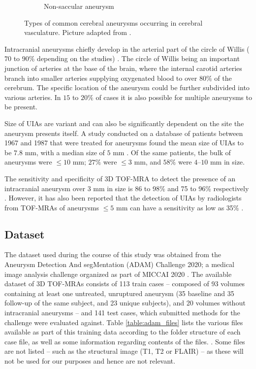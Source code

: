 \begin{figure}[h]
\begin{subfigure}{.45\linewidth}
		\caption[Non-saccular aneurysm]{Non-saccular aneurysm}
	\end{subfigure}
	\caption[Types of aneurysms.]{Types of common cerebral aneurysms occurring in cerebral vasculature. Picture adapted from \citeauthor{Withers2013}.}
	\label{fig:aneurysms.png}
\end{figure}

Intracranial aneurysms chiefly develop in the arterial part of the circle of Willis ($70$ to $90\%$ depending on the studies) \cite{Rodriguez-Regent2014}. The circle of Willis being an important junction of arteries at the base of the brain, where the internal carotid arteries branch into smaller arteries supplying oxygenated blood to over $80\%$ of the cerebrum. The specific location of the aneurysm could be further subdivided into various arteries. In $15$ to $20\%$ of cases it is also possible for multiple aneurysms to be present.

Size of UIAs are variant and can also be significantly dependent on the site the aneurysm presents itself. A study conducted on a database of patients between 1967 and 1987 that were treated for aneurysms found the mean size of UIAs to be $7.8$ mm, with a median size of $5$ mm \cite{Weir2002}. Of the same patients, the bulk of aneurysms were $\leq 10$ mm; $27\%$ were $\leq 3$ mm, and $58\%$ were $4$--$10$ mm in size.

The sensitivity and specificity of 3D TOF-MRA to detect the presence of an intracranial aneurysm over 3 mm in size is 86 to 98\% and 75 to 96\% respectively \cite{Sailer2014}. However, it has also been reported that the detection of UIAs by radiologists from TOF-MRAs of aneurysms $\leq 5$ mm can have a sensitivity as low as 35\% \cite{White2001}.

\subsection{Dataset}
The dataset used during the course of this study was obtained from the Aneurysm Detection And segMentation (ADAM) Challenge 2020; a medical image analysis challenge organized as part of MICCAI 2020 \cite{Timmins2020}. The available dataset of 3D TOF-MRAs consists of 113 train cases -- composed of 93 volumes containing at least one untreated, unruptured aneurysm (35 baseline and 35 follow-up of the same subject, and 23 unique subjects), and 20 volumes without intracranial aneurysms -- and 141 test cases, which submitted methods for the challenge were evaluated against. Table \ref{table:adam_files} lists the various files available as part of this training data according to the folder structure of each case file, as well as some information regarding contents of the files. . Some files are not listed -- such as the structural image (T1, T2 or FLAIR) -- as these will not be used for our purposes and hence are not relevant.

